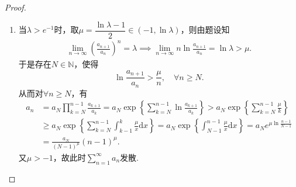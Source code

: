 \documentclass[../../main.tex]{subfiles}%
\begin{document}
\begin{proof}
\begin{enumerate}[(1)]
\item 当$\lambda > e^{-1}$时，取$\mu = \dfrac{\ln\lambda - 1}{2} \in (-1, \ln\lambda)$，则由题设知
\begin{align*}
\lim_{n\to\infty} \left( \frac{a_{n+1}}{a_n} \right)^n = \lambda \implies \lim_{n\to\infty} n\ln\frac{a_{n+1}}{a_n} = \ln\lambda > \mu.
\end{align*}
于是存在$N\in\mathbb{N}$，使得
$$\ln\frac{a_{n+1}}{a_n} > \frac{\mu}{n}, \quad \forall n\geqslant N.$$
从而对$\forall n\geqslant N$，有
\begin{align*}
a_n&=a_N\prod_{k=N}^{n-1}{\frac{a_{k+1}}{a_k}}=a_N\exp \left\{ \sum_{k=N}^{n-1}{\ln \frac{a_{k+1}}{a_k}} \right\} >a_N\exp \left\{ \sum_{k=N}^{n-1}{\frac{\mu}{k}} \right\} 
\\
&\geqslant a_N\exp \left\{ \sum_{k=N}^{n-1}{\int_{k-1}^k{\frac{\mu}{x}\mathrm{d}x}} \right\} =a_N\exp \left\{ \int_{N-1}^{n-1}{\frac{\mu}{x}\mathrm{d}x} \right\} =a_Ne^{\mu \ln \frac{n-1}{N-1}}
\\
&=\frac{a_N}{(N-1)^{\mu}}(n-1)^{\mu}.
\end{align*}
又$\mu > -1$，故此时$\sum\limits_{n=1}^{\infty} a_n$发散.
\end{enumerate}

\end{proof}
\end{document}
